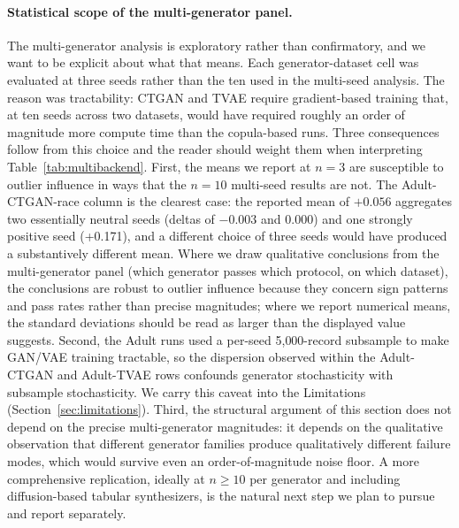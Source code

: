 \documentclass[11pt]{article}
\begin{document}
\paragraph{Statistical scope of the multi-generator panel.} The multi-generator analysis is exploratory rather than confirmatory, and we want to be explicit about what that means. Each generator-dataset cell was evaluated at three seeds rather than the ten used in the multi-seed analysis. The reason was tractability: CTGAN and TVAE require gradient-based training that, at ten seeds across two datasets, would have required roughly an order of magnitude more compute time than the copula-based runs. Three consequences follow from this choice and the reader should weight them when interpreting Table~\ref{tab:multibackend}. First, the means we report at $n = 3$ are susceptible to outlier influence in ways that the $n = 10$ multi-seed results are not. The Adult-CTGAN-race column is the clearest case: the reported mean of $+0.056$ aggregates two essentially neutral seeds (deltas of $-0.003$ and $0.000$) and one strongly positive seed (+0.171), and a different choice of three seeds would have produced a substantively different mean. Where we draw qualitative conclusions from the multi-generator panel (which generator passes which protocol, on which dataset), the conclusions are robust to outlier influence because they concern sign patterns and pass rates rather than precise magnitudes; where we report numerical means, the standard deviations should be read as larger than the displayed value suggests. Second, the Adult runs used a per-seed 5{,}000-record subsample to make GAN/VAE training tractable, so the dispersion observed within the Adult-CTGAN and Adult-TVAE rows confounds generator stochasticity with subsample stochasticity. We carry this caveat into the Limitations (Section~\ref{sec:limitations}). Third, the structural argument of this section does not depend on the precise multi-generator magnitudes: it depends on the qualitative observation that different generator families produce qualitatively different failure modes, which would survive even an order-of-magnitude noise floor. A more comprehensive replication, ideally at $n \geq 10$ per generator and including diffusion-based tabular synthesizers, is the natural next step we plan to pursue and report separately.
\end{document}

